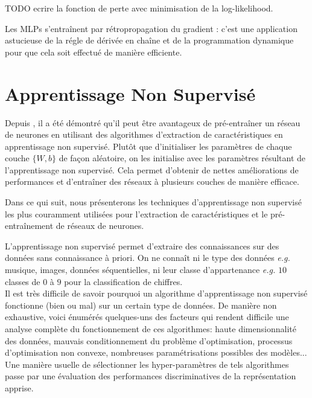 TODO ecrire la fonction de perte avec minimisation de la log-likelihood.

Les MLPs s'entraînent par rétropropagation du gradient \citep{Rumelhart86b}: c'est une application
astucieuse de la régle de dérivée en chaîne et de la programmation dynamique
pour que cela soit effectué de manière efficiente.
\\

\section{Apprentissage Non Supervisé}

Depuis \citep{Hinton06,Bengio-nips-2006}, il a été démontré qu'il peut être
avantageux de pré-entraîner un réseau de neurones en utilisant des algorithmes
d'extraction de caractéristiques en apprentissage non supervisé. Plutôt que
d'initialiser les paramètres de chaque couche $\lbrace W,b \rbrace$ de façon
aléatoire, on les initialise avec les paramètres résultant de l'apprentissage
non supervisé.  Cela permet d'obtenir de nettes améliorations de performances
et d'entraîner des réseaux à plusieurs couches de manière efficace.

Dans ce qui suit, nous présenterons les techniques d'apprentissage non
supervisé les plus couramment utilisées pour l'extraction de caractéristiques
et le pré-entraînement de réseaux de neurones.

L'apprentissage non supervisé permet d'extraire des connaissances sur des
données sans connaissance à priori. On ne connaît ni le type des données
\textit{e.g.} musique, images, données séquentielles, ni leur classe
d'appartenance \textit{e.g.} $10$ classes de $0$ à $9$ pour la classification
de chiffres.  \\

Il est très difficile de savoir pourquoi un algorithme d'apprentissage non
supervisé fonctionne (bien ou mal) sur un certain type de données.  De manière
non exhaustive, voici énumérés quelques-uns des facteurs qui rendent difficile
une analyse complète du fonctionnement de ces algorithmes: haute
dimensionnalité des données, mauvais conditionnement du problème
d'optimisation, processus d'optimisation non convexe, nombreuses
paramétrisations possibles des modèles...  \\

Une manière usuelle de sélectionner les hyper-paramètres de tels algorithmes passe 
par une évaluation des performances discriminatives de la
représentation apprise.

